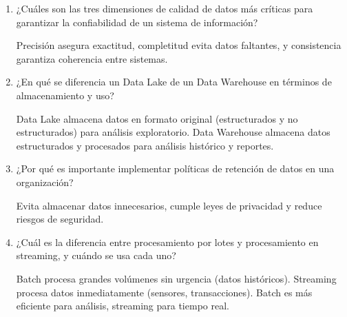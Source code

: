 \documentclass[12pt]{article}
\begin{document}
\begin{enumerate}[label=\arabic*.]
\item ¿Cuáles son las tres dimensiones de calidad de datos más críticas para garantizar la confiabilidad de un sistema de información?

Precisión asegura exactitud, completitud evita datos faltantes, y consistencia garantiza coherencia entre sistemas.

\item ¿En qué se diferencia un Data Lake de un Data Warehouse en términos de almacenamiento y uso?

Data Lake almacena datos en formato original (estructurados y no estructurados) para análisis exploratorio. Data Warehouse almacena datos estructurados y procesados para análisis histórico y reportes.

\item ¿Por qué es importante implementar políticas de retención de datos en una organización?

Evita almacenar datos innecesarios, cumple leyes de privacidad y reduce riesgos de seguridad.

\item ¿Cuál es la diferencia entre procesamiento por lotes y procesamiento en streaming, y cuándo se usa cada uno?

Batch procesa grandes volúmenes sin urgencia (datos históricos). Streaming procesa datos inmediatamente (sensores, transacciones). Batch es más eficiente para análisis, streaming para tiempo real.

\end{enumerate}
\end{document}
